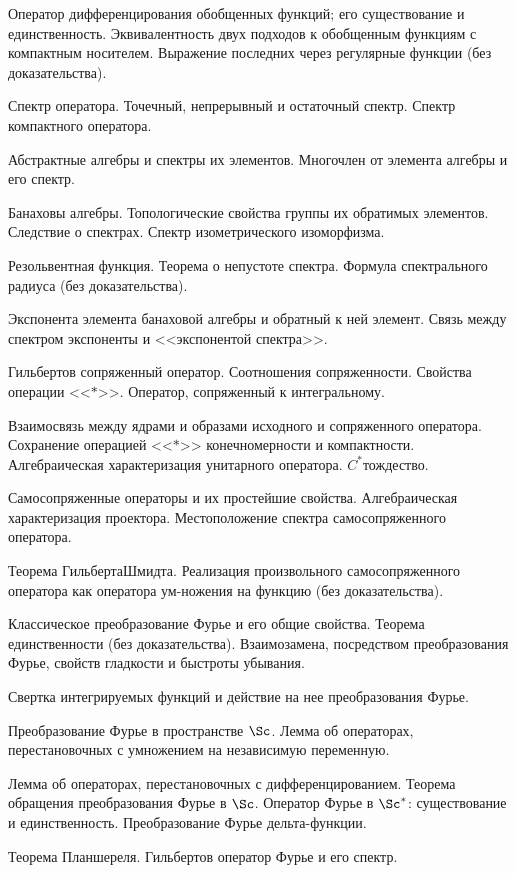 \documentclass[a4paper]{article}
\begin{document}
\begin{nums}{-3}
\item Оператор дифференцирования обобщенных функций; его существование и
единственность. Эквивалентность двух подходов к обобщенным функциям с
компактным носителем. Выражение последних через регулярные функции (без доказательства).
\item Спектр оператора. Точечный, непрерывный и остаточный спектр. Спектр компактного оператора.
\item Абстрактные алгебры и спектры их элементов. Многочлен от элемента
алгебры и его спектр.
\item Банаховы алгебры. Топологические свойства группы их обратимых элементов.
Следствие о спектрах. Спектр изометрического изоморфизма.
\item Резольвентная функция. Теорема о непустоте спектра. Формула спектрального радиуса (без доказательства).
\item Экспонента элемента банаховой алгебры и обратный к ней элемент. Связь
между спектром экспоненты и <<экспонентой спектра>>.
\item Гильбертов сопряженный оператор. Соотношения сопряженности. Свойства операции
<<$*$>>. Оператор, сопряженный к интегральному.
\item Взаимосвязь между ядрами и образами исходного и сопряженного оператора.
Сохранение операцией <<$*$>> конечномерности и компактности.
Алгебраическая характеризация унитарного оператора. $C^*$\д тождество.
\item Самосопряженные операторы и их простейшие свойства. Алгебраическая
характеризация проектора. Местоположение спектра самосопряженного оператора.
\item Теорема Гильберта\ч Шмидта. Реализация произвольного самосопряженного оператора
как оператора ум-\break ножения на функцию (без доказательства).
\item Классическое преобразование Фурье и его общие свойства. Теорема единственности (без доказательства).
Взаимозамена, посредством преобразования Фурье, свойств гладкости и быстроты убывания.
\item Свертка интегрируемых функций и действие на нее преобразования Фурье.
\item Преобразование Фурье в пространстве $\Sc$. Лемма об операторах,
перестановочных с умножением на независимую переменную.
\item Лемма об операторах, перестановочных с дифференцированием. Теорема обращения преобразования Фурье
в $\Sc$. Оператор Фурье в $\Sc^*$: существование и единственность. Преобразование Фурье дельта-функции.
\item Теорема Планшереля. Гильбертов оператор Фурье и его спектр.
\end{nums}
\end{document}
